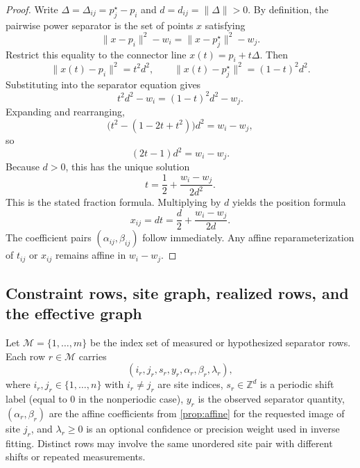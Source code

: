 \documentclass[preprint,12pt]{elsarticle}
\newcommand{\rowset}{\mathcal{M}}
\begin{document}
\begin{proof}
Write $\Delta=\Delta_{ij}=p_j^{\star}-p_i$ and $d=d_{ij}=\lVert \Delta \rVert>0$.
By definition, the pairwise power separator is the set of points $x$ satisfying
\begin{equation}
    \lVert x-p_i \rVert^2 - w_i = \lVert x-p_j^{\star} \rVert^2 - w_j.
\end{equation}
Restrict this equality to the connector line $x(t)=p_i+t\Delta$. Then
\begin{equation}
    \lVert x(t)-p_i \rVert^2 = t^2 d^2,
    \qquad
    \lVert x(t)-p_j^{\star} \rVert^2 = (1-t)^2 d^2.
\end{equation}
Substituting into the separator equation gives
\begin{equation}
    t^2 d^2 - w_i = (1-t)^2 d^2 - w_j.
\end{equation}
Expanding and rearranging,
\begin{equation}
    \bigl(t^2-(1-2t+t^2)\bigr)d^2 = w_i-w_j,
\end{equation}
so
\begin{equation}
    (2t-1)d^2 = w_i-w_j.
\end{equation}
Because $d>0$, this has the unique solution
\begin{equation}
    t = \frac12 + \frac{w_i-w_j}{2d^2}.
\end{equation}
This is the stated fraction formula. Multiplying by $d$ yields the position
formula
\begin{equation}
    x_{ij}=dt = \frac d2 + \frac{w_i-w_j}{2d}.
\end{equation}
The coefficient pairs $(\alpha_{ij},\beta_{ij})$ follow immediately. Any affine
reparameterization of $t_{ij}$ or $x_{ij}$ remains affine in $w_i-w_j$.
\end{proof}

\subsection{Constraint rows, site graph, realized rows, and the effective graph}
Let $\rowset=\{1,\dots,m\}$ be the index set of measured or hypothesized
separator rows. Each row $r\in\rowset$ carries
\begin{equation}
    (i_r,j_r,s_r,y_r,\alpha_r,\beta_r,\lambda_r),
\end{equation}
where $i_r,j_r\in\{1,\dots,n\}$ with $i_r\neq j_r$ are site indices,
$s_r\in\mathbb{Z}^d$ is a periodic shift label (equal to $0$ in the
nonperiodic case), $y_r$ is the observed separator quantity,
$(\alpha_r,\beta_r)$ are the affine coefficients from \cref{prop:affine} for
the requested image of site $j_r$, and $\lambda_r\ge 0$ is an optional
confidence or precision weight used in inverse fitting. Distinct rows may
involve the same unordered site pair with different shifts or repeated
measurements.
\end{document}
